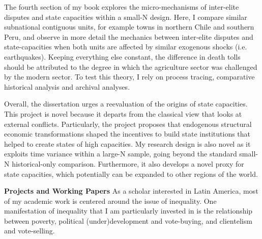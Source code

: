 \documentclass[11pt]{letter} %
\begin{document}
\begin{letter}{}
The fourth section of my book explores the micro-mechanisms of inter-elite disputes and state capacities within a small-N design. Here, I compare similar subnational contiguous units, for example towns in northern Chile and southern Peru, and observe in more detail the mechanics between inter-elite disputes and state-capacities when both units are affected by similar exogenous shocks (i.e. earthquakes). Keeping everything else constant, the difference in death tolls should be attributed to the degree in which the agriculture sector was challenged by the modern sector. To test this theory, I rely on process tracing, comparative historical analysis and archival analyses. 

Overall, the dissertation urges a reevaluation of the origins of state capacities. This project is novel because it departs from the classical view that looks at external conflicts. Particularly, the project proposes that endogenous structural economic transformations shaped the incentives to build state institutions that helped to create states of high capacities. My research design is also novel as it exploits time variance within a large-N sample, going beyond the standard small-N historical-only comparison. Furthermore, it also develops a novel proxy for state capacities, which potentially can be expanded to other regions of the world.


{\bf Projects and Working Papers} As a scholar interested in Latin America, most of my academic work is centered around the issue of inequality. One manifestation of inequality that I am particularly invested in is the relationship between poverty, political (under)development and vote-buying, and clientelism and vote-selling. 


\end{letter}
\end{document}
